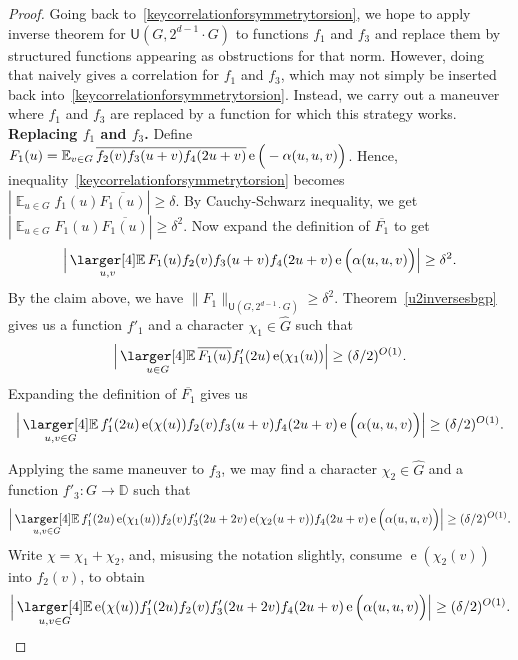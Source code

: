 \documentclass[a4paper,11pt]{article}
\numberwithin{theorem}{section}
\theoremstyle{definition}
\newcommand{\on}[1]{
	\operatorname{#1}
}
\newcommand\ex{\mathop{\mathbb{E}}}
\newcommand{\exx}{
  \mathop{
    \mathchoice{\vcenter{\hbox{\larger[4]$\mathbb{E}$}}}
               {\kern0pt\mathbb{E}}
               {\kern0pt\mathbb{E}}
               {\kern0pt\mathbb{E}}
  }\displaylimits
}
\begin{document}
\begin{proof}
    Going back to~\eqref{keycorrelationforsymmetrytorsion}, we hope to apply inverse theorem for $\mathsf{U}(G, 2^{d-1}\cdot G)$ to functions $f_1$ and $f_3$ and replace them by structured functions appearing as obstructions for that norm. However, doing that naively gives a correlation for $f_1$ and $f_3$, which may not simply be inserted back into~\eqref{keycorrelationforsymmetrytorsion}. Instead, we carry out a maneuver where $f_1$ and $f_3$ are replaced by a function for which this strategy works.\\

    \noindent\textbf{Replacing $f_1$ and $f_3$.} Define $F_1(u) = \exx_{v \in G} \overline{f_2(v) f_3(u + v) f_4(2u + v)} \on{e}\Big(-\alpha(u,u, v)\Big)$. Hence, inequality~\eqref{keycorrelationforsymmetrytorsion} becomes $|\ex_{u \in G}f_1(u) \overline{F_1(u)} | \geq \delta.$ By Cauchy-Schwarz inequality, we get
    $|\ex_{u \in G}F_1(u) \overline{F_1(u)} | \geq \delta^2$. Now expand the definition of $\overline{F_1}$ to get
    \[\Big|\exx_{u , v} F_1(u) f_2(v) f_3(u + v) f_4(2u + v) \on{e}\Big(\alpha(u,u, v)\Big)\Big| \geq \delta^2.\]
    By the claim above, we have $\|F_1\|_{\mathsf{U}(G, 2^{d-1}\cdot G)} \geq \delta^2$. Theorem~\ref{u2inversesbgp} gives us a function $f'_1$ and a character $\chi_1 \in \hat{G}$ such that
    \[\Big|\exx_{u \in G}\overline{F_1(u)} f'_1(2u) \on{e}(\chi_1(u))\Big| \geq (\delta/2)^{O(1)}.\]
    Expanding the definition of $\overline{F_1}$ gives us     
    \[\Big|\exx_{u,v \in G} f'_1(2u) \on{e}(\chi(u))f_2(v) f_3(u + v) f_4(2u + v) \on{e}\Big(\alpha(u,u, v)\Big)\Big| \geq (\delta/2)^{O(1)}.\]

    Applying the same maneuver to $f_3$, we may find a character $\chi_2 \in \hat{G}$ and a function $f'_3 : G \to \mathbb{D}$ such that
    \[\Big|\exx_{u , v \in G} f'_1(2u) \on{e}(\chi_1(u))f_2(v) f'_3(2u + 2v) \on{e}(\chi_2(u + v)) f_4(2u + v) \on{e}\Big(\alpha(u,u, v)\Big)\Big| \geq (\delta/2)^{O(1)}.\]
    Write $\chi = \chi_1 + \chi_2$, and, misusing the notation slightly, consume $\on{e}(\chi_2(v))$ into $f_2(v)$, to obtain
    \begin{equation}\label{preintegrationtorsionlemmaeqfreplaced}\Big|\exx_{u , v \in G} \on{e}(\chi(u))f'_1(2u) f_2(v) f'_3(2u + 2v) f_4(2u + v) \on{e}\Big(\alpha(u,u, v)\Big)\Big| \geq (\delta/2)^{O(1)}.\end{equation}


\end{proof}
\end{document}
